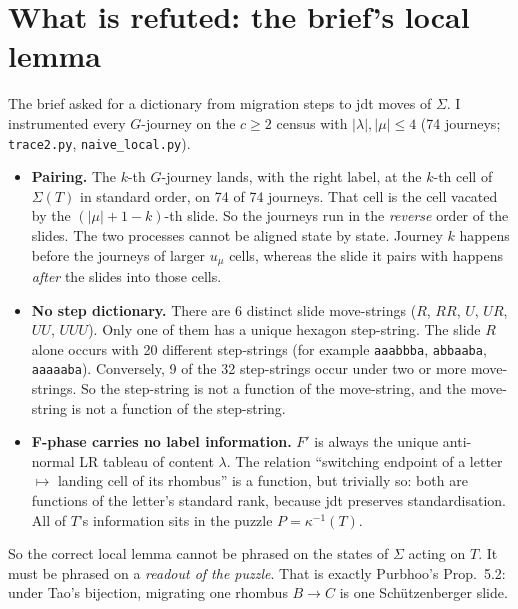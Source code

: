 \documentclass[11pt]{article}
\theoremstyle{definition}
\begin{document}
\section{What is refuted: the brief's local lemma}
The brief asked for a dictionary from migration steps to jdt moves of $\Sigma$. I instrumented every $G$-journey on the
$c\ge2$ census with $|\lambda|,|\mu|\le4$ (74 journeys; \texttt{trace2.py}, \texttt{naive\_local.py}).
\begin{itemize}
\item \textbf{Pairing.} The $k$-th $G$-journey lands, with the right label, at the $k$-th cell of $\Sigma(T)$ in
standard order, on 74 of 74 journeys. That cell is the cell vacated by the $(|\mu|+1-k)$-th slide. So the journeys run in the
\emph{reverse} order of the slides. The two processes cannot be aligned state by state. Journey $k$ happens before
the journeys of larger $u_\mu$ cells, whereas the slide it pairs with happens \emph{after} the slides into those cells.
\item \textbf{No step dictionary.} There are 6 distinct slide move-strings ($R$, $RR$, $U$, $UR$, $UU$, $UUU$). Only one
of them has a unique hexagon step-string. The slide $R$ alone occurs with 20 different step-strings (for example
\texttt{aaabbba}, \texttt{abbaaba}, \texttt{aaaaaba}). Conversely, 9 of the 32 step-strings occur under two or more move-strings.
So the step-string is not a function of the move-string, and the move-string is not a function of the step-string.
\item \textbf{F-phase carries no label information.} $F'$ is always the unique anti-normal LR tableau of content
$\lambda$. The relation ``switching endpoint of a letter $\mapsto$ landing cell of its rhombus'' is a function, but
trivially so: both are functions of the letter's standard rank, because jdt preserves standardisation. All of
$T$'s information sits in the puzzle $P=\kappa^{-1}(T)$.
\end{itemize}
So the correct local lemma cannot be phrased on the states of $\Sigma$ acting on $T$. It must be phrased on a
\emph{readout of the puzzle}. That is exactly Purbhoo's Prop.~5.2: under Tao's bijection, migrating one rhombus
$B\to C$ is one Schützenberger slide.
\end{document}
